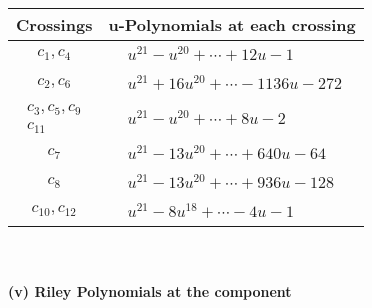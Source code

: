 \documentclass[1p]{elsarticle_modified}
\theoremstyle{definition}
\begin{document}
\begin{tabular}{m{50pt}|m{274pt}}
Crossings & \hspace{64pt}u-Polynomials at each crossing \\
\hline $$\begin{aligned}c_{1},c_{4}\end{aligned}$$&$\begin{aligned}
&u^{21}- u^{20}+\cdots+12 u-1
\end{aligned}$\\
\hline $$\begin{aligned}c_{2},c_{6}\end{aligned}$$&$\begin{aligned}
&u^{21}+16 u^{20}+\cdots-1136 u-272
\end{aligned}$\\
\hline $$\begin{aligned}c_{3},c_{5},c_{9}\\c_{11}\end{aligned}$$&$\begin{aligned}
&u^{21}- u^{20}+\cdots+8 u-2
\end{aligned}$\\
\hline $$\begin{aligned}c_{7}\end{aligned}$$&$\begin{aligned}
&u^{21}-13 u^{20}+\cdots+640 u-64
\end{aligned}$\\
\hline $$\begin{aligned}c_{8}\end{aligned}$$&$\begin{aligned}
&u^{21}-13 u^{20}+\cdots+936 u-128
\end{aligned}$\\
\hline $$\begin{aligned}c_{10},c_{12}\end{aligned}$$&$\begin{aligned}
&u^{21}-8 u^{18}+\cdots-4 u-1
\end{aligned}$\\
\hline
\end{tabular}\\~\\
\newpage\renewcommand{\arraystretch}{1}
\flushleft \textbf{(v) Riley Polynomials at the component}\newline \\
\end{document}
